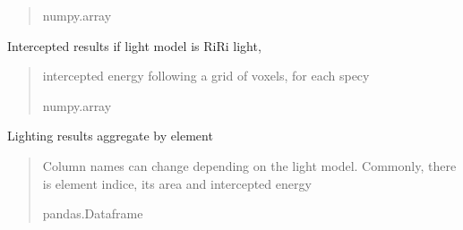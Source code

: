 \documentclass[letterpaper,10pt,english]{sphinxmanual}
\begin{document}
\begin{fulllineitems}
\begin{fulllineitems}
\begin{quote}
\begin{description}
\sphinxAtStartPar
numpy.array

\end{description}\end{quote}

\end{fulllineitems}


\begin{fulllineitems}
\label{\detokenize{reference:LVM.LightVegeManager.riri5_intercepted_light}}
\pysigstartsignatures
{}
\pysigstopsignatures
\sphinxAtStartPar
Intercepted results if light model is RiRi light,
\begin{quote}\begin{description}
\sphinxAtStartPar
intercepted energy following a grid of voxels, for each specy

\sphinxAtStartPar
numpy.array

\end{description}\end{quote}

\end{fulllineitems}


\begin{fulllineitems}
\label{\detokenize{reference:LVM.LightVegeManager.elements_outputs}}
\pysigstartsignatures
{}
\pysigstopsignatures
\sphinxAtStartPar
Lighting results aggregate by element
\begin{quote}\begin{description}
\sphinxAtStartPar
Column names can change depending on the light model. Commonly, there is element indice, its area and intercepted energy

\sphinxAtStartPar
pandas.Dataframe

\end{description}\end{quote}


\end{fulllineitems}
\end{fulllineitems}
\end{document}
